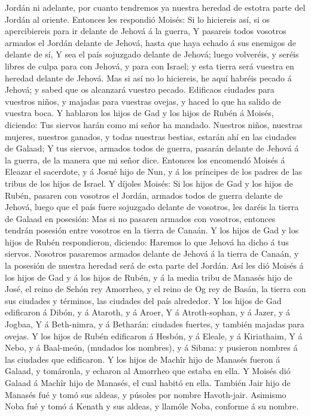 Jordán ni adelante, por cuanto tendremos ya nuestra heredad de estotra
parte del Jordán al oriente.  Entonces les respondió
Moisés: Si lo hiciereis así, si os apercibiereis para ir delante de
Jehová á la guerra,  Y pasareis todos vosotros armados el
Jordán delante de Jehová, hasta que haya echado á sus enemigos de
delante de sí,  Y sea el país sojuzgado delante de Jehová;
luego volveréis, y seréis libres de culpa para con Jehová, y para con
Israel; y esta tierra será vuestra en heredad delante de Jehová.
 Mas si así no lo hiciereis, he aquí habréis pecado á
Jehová; y sabed que os alcanzará vuestro pecado.  Edificaos
ciudades para vuestros niños, y majadas para vuestras ovejas, y haced lo
que ha salido de vuestra boca.  Y hablaron los hijos de Gad
y los hijos de Rubén á Moisés, diciendo: Tus siervos harán como mi señor
ha mandado.  Nuestros niños, nuestras mujeres, nuestros
ganados, y todas nuestras bestias, estarán ahí en las ciudades de
Galaad;  Y tus siervos, armados todos de guerra, pasarán
delante de Jehová á la guerra, de la manera que mi señor dice.
 Entonces los encomendó Moisés á Eleazar el sacerdote, y á
Josué hijo de Nun, y á los príncipes de los padres de las tribus de los
hijos de Israel.  Y díjoles Moisés: Si los hijos de Gad y
los hijos de Rubén, pasaren con vosotros el Jordán, armados todos de
guerra delante de Jehová, luego que el país fuere sojuzgado delante de
vosotros, les daréis la tierra de Galaad en posesión:  Mas
si no pasaren armados con vosotros, entonces tendrán posesión entre
vosotros en la tierra de Canaán.  Y los hijos de Gad y los
hijos de Rubén respondieron, diciendo: Haremos lo que Jehová ha dicho á
tus siervos.  Nosotros pasaremos armados delante de Jehová
á la tierra de Canaán, y la posesión de nuestra heredad será de esta
parte del Jordán.  Así les dió Moisés á los hijos de Gad y
á los hijos de Rubén, y á la media tribu de Manasés hijo de José, el
reino de Sehón rey Amorrheo, y el reino de Og rey de Basán, la tierra
con sus ciudades y términos, las ciudades del país alrededor.
 Y los hijos de Gad edificaron á Dibón, y á Ataroth, y á
Aroer,  Y á Atroth-sophan, y á Jazer, y á Jogbaa,
 Y á Beth-nimra, y á Betharán: ciudades fuertes, y también
majadas para ovejas.  Y los hijos de Rubén edificaron á
Hesbón, y á Eleale, y á Kiriathaim,  Y á Nebo, y á
Baal-meón, (mudados los nombres), y á Sibma: y pusieron nombres á las
ciudades que edificaron.  Y los hijos de Machîr hijo de
Manasés fueron á Galaad, y tomáronla, y echaron al Amorrheo que estaba
en ella.  Y Moisés dió Galaad á Machîr hijo de Manasés, el
cual habitó en ella.  También Jair hijo de Manasés fué y
tomó sus aldeas, y púsoles por nombre Havoth-jair. 
Asimismo Noba fué y tomó á Kenath y sus aldeas, y llamóle Noba, conforme
á su nombre.

